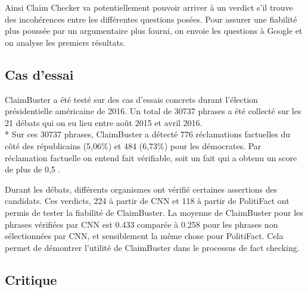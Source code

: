 Ainsi Claim Checker va potentiellement pouvoir arriver à un verdict s'il trouve des incohérences entre les différentes questions posées. Pour assurer une fiabilité plus poussée par un argumentaire plus fourni, on envoie les questions à Google et on analyse les premiers résultats.

\subsection{Cas d'essai}

ClaimBuster a été testé sur des cas d'essais concrets durant l'élection présidentielle américaine de 2016. Un total de 30737 phrases a été collecté sur les 21 débats qui on eu lieu entre août 2015 et avril 2016.
\\*
Sur ces 30737 phrases, ClaimBuster a détecté 776 réclamations factuelles du côté des républicains (5,06\%) et 484 (6,73\%) pour les démocrates. Par réclamation factuelle on entend fait vérifiable, soit un fait qui a obtenu un score de plus de 0,5 \cite{hassan2017toward}.

Durant les débats, différents organismes ont vérifié certaines assertions des candidats. Ces verdicts, 224 à partir de CNN et 118 à partir de PolitiFact ont permis de tester la fiabilité de ClaimBuster. La moyenne de ClaimBuster pour les phrases vérifiées par CNN est 0.433 comparée à 0.258 pour les phrases non sélectionnées par CNN, et sensiblement la même chose pour PolitiFact. Cela permet de démontrer l'utilité de ClaimBuster dans le processus de fact checking.

\subsection{Critique}

